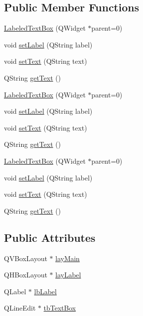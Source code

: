 \subsection*{Public Member Functions}
\begin{DoxyCompactItemize}
\item 
\hyperlink{class_labeled_text_box_a028e983b5cad3d0180dfcf9b9ad326db}{LabeledTextBox} (QWidget $\ast$parent=0)
\item 
void \hyperlink{class_labeled_text_box_a09481e4b541a03aed2ba0beff29e426f}{setLabel} (QString label)
\item 
void \hyperlink{class_labeled_text_box_a644991506e3c4a3e7c40279217f868c9}{setText} (QString text)
\item 
QString \hyperlink{class_labeled_text_box_a28f0a04fd179ae410c9fc7e4cc9b2460}{getText} ()
\item 
\hyperlink{class_labeled_text_box_a028e983b5cad3d0180dfcf9b9ad326db}{LabeledTextBox} (QWidget $\ast$parent=0)
\item 
void \hyperlink{class_labeled_text_box_a09481e4b541a03aed2ba0beff29e426f}{setLabel} (QString label)
\item 
void \hyperlink{class_labeled_text_box_a644991506e3c4a3e7c40279217f868c9}{setText} (QString text)
\item 
QString \hyperlink{class_labeled_text_box_a28f0a04fd179ae410c9fc7e4cc9b2460}{getText} ()
\item 
\hyperlink{class_labeled_text_box_a028e983b5cad3d0180dfcf9b9ad326db}{LabeledTextBox} (QWidget $\ast$parent=0)
\item 
void \hyperlink{class_labeled_text_box_a09481e4b541a03aed2ba0beff29e426f}{setLabel} (QString label)
\item 
void \hyperlink{class_labeled_text_box_a644991506e3c4a3e7c40279217f868c9}{setText} (QString text)
\item 
QString \hyperlink{class_labeled_text_box_a28f0a04fd179ae410c9fc7e4cc9b2460}{getText} ()
\end{DoxyCompactItemize}
\subsection*{Public Attributes}
\begin{DoxyCompactItemize}
\item 
QVBoxLayout $\ast$ \hyperlink{class_labeled_text_box_a48fdcf7988198583d94b7f5e80c76410}{layMain}
\item 
QHBoxLayout $\ast$ \hyperlink{class_labeled_text_box_abeb456948771d40209213e6e671b3c2d}{layLabel}
\item 
QLabel $\ast$ \hyperlink{class_labeled_text_box_acf8bab4d7f0c2e5278e3bb9199caf2a6}{lbLabel}
\item 
QLineEdit $\ast$ \hyperlink{class_labeled_text_box_af46ea8892c082bbba651bcf269a6c9d9}{tbTextBox}
\end{DoxyCompactItemize}


